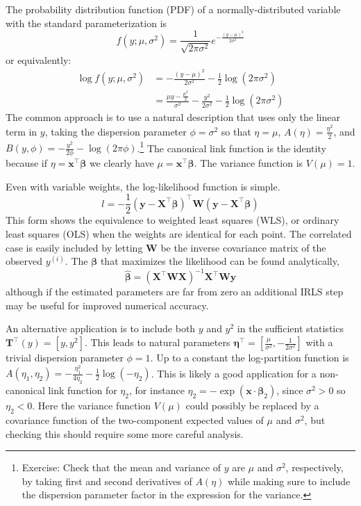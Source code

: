 \documentclass{article}
\newcommand{\bbeta}{\boldsymbol{\beta}}
\begin{document}
The probability distribution function (PDF) of a normally-distributed variable
with the standard parameterization is
\[ f(y; \mu, \sigma^2) = \frac{1}{\sqrt{2\pi\sigma^2}} e^{-\frac{(y - \mu)^2}{2\sigma^2}} \]
or equivalently:
\begin{align}
\log f(y; \mu, \sigma^2) &= -\frac{(y-\mu)^2}{2\sigma^2} - \frac{1}{2} \log (2\pi\sigma^2) \\\
&= \frac{\mu y - \frac{\mu^2}{2}}{\sigma^2} - \frac{y^2}{2\sigma^2} -
\frac{1}{2} \log (2\pi\sigma^2)
\end{align}
The common approach is to use a natural description that uses only the linear
term in \(y\), taking the dispersion parameter \(\phi = \sigma^2\) so that
\(\eta = \mu\), \(A(\eta) = \frac{\eta^2}{2}\), and \(B(y, \phi) =
-\frac{y^2}{2\phi} - \log(2\pi\phi) \).\footnote{
    Exercise: Check that the mean and variance of \(y\) are \(\mu\) and
    \(\sigma^2\), respectively, by taking first and second derivatives of
    \(A(\eta)\) while making sure to include the dispersion parameter factor
    in the expression for the variance.
}
The canonical link function is the identity because if \(\eta =
\mathbf{x}^\intercal\bbeta\) we clearly have \(\mu =
\mathbf{x}^\intercal \bbeta\).
The variance function is \(V(\mu) = 1\).

Even with variable weights, the log-likelihood function is simple.
\[ l = -\frac{1}{2} (\mathbf{y} - \mathbf{X}^\intercal
\bbeta)^\intercal \mathbf{W} (\mathbf{y} - \mathbf{X}^\intercal
\bbeta) \]
This form shows the equivalence to weighted least squares (WLS), or ordinary
least squares (OLS) when the weights are identical for each point.
The correlated case is easily included by letting \(\mathbf{W}\) be the
inverse covariance matrix of the observed \(y^{(i)}\). The
\(\bbeta\) that maximizes the likelihood can be found
analytically,
\[ \hat{\bbeta} = (\mathbf{X}^\intercal \mathbf{W} \mathbf{X})^{-1}
\mathbf{X}^\intercal \mathbf{W} \mathbf{y} \]
although if the estimated parameters are far from zero an additional IRLS step
may be useful for improved numerical accuracy.

An alternative application is to include both \(y\) and \(y^2\) in the
sufficient statistics \(\mathbf{T}^\intercal(y) = [y, y^2]\). This leads to
natural parameters \(\boldsymbol{\eta}^\intercal = \left[ \frac{\mu}{\sigma^2},
-\frac{1}{2\sigma^2} \right] \) with a trivial dispersion parameter \(\phi =
1\). Up to a constant the log-partition function is \(A(\eta_1, \eta_2) =
-\frac{\eta_1^2}{4\eta_2} - \frac{1}{2}\log (-\eta_2) \). This is likely a good
application for a non-canonical link function for \(\eta_2\), for instance
\(\eta_2 = - \exp(\mathbf{x}\cdot\bbeta_2)\), since \(\sigma^2 >
0\) so \(\eta_2 < 0\). Here the variance function \(V(\mu)\) could possibly
be replaced by a covariance function of the two-component expected values of
\(\mu\) and \(\sigma^2\), but checking this should require some more careful
analysis. 
\end{document}

